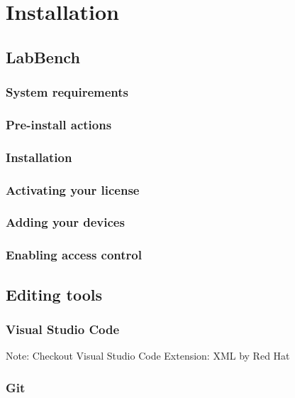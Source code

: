 \chapter{Installation}
\label{ch:Installation}

\section{LabBench}

\subsection{System requirements}

\subsection{Pre-install actions}

\subsection{Installation}

\subsection{Activating your license}

\subsection{Adding your devices}

\subsection{Enabling access control}

\section{Editing tools}

\subsection{Visual Studio Code}

Note: Checkout Visual Studio Code Extension: XML by Red Hat 

\subsection{Git}

